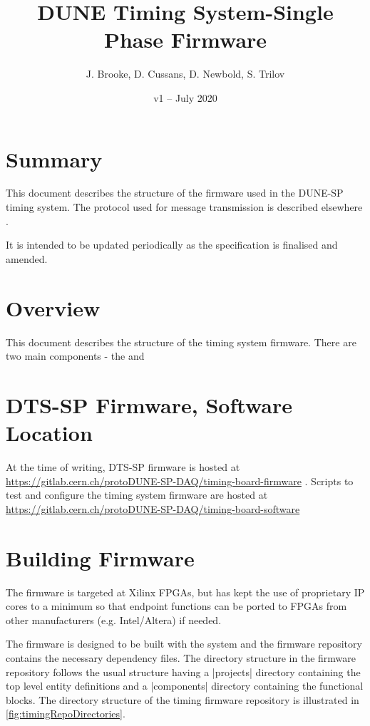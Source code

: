 \documentclass{dune}
\title{DUNE Timing System-Single Phase Firmware}
\author{J. Brooke, D. Cussans, D. Newbold, S. Trilov}
\date{v1 -- July 2020}
\begin{document}
\maketitle
\tableofcontents


\section{Summary}

This document describes the structure of the firmware used in the DUNE-SP timing system. The protocol used for message transmission is described elsewhere \cite{ref:dts-sp-timing-protocol}.

It is intended to be updated periodically as the specification is finalised and amended.

\section{Overview}

This document describes the structure of the timing system firmware. There are two main components - the  and 

\section{DTS-SP Firmware, Software Location}

At the time of writing, DTS-SP firmware is hosted at \url{https://gitlab.cern.ch/protoDUNE-SP-DAQ/timing-board-firmware} . Scripts to test and configure the timing system firmware are hosted at \url{https://gitlab.cern.ch/protoDUNE-SP-DAQ/timing-board-software}

\section{Building Firmware}

The firmware is targeted at Xilinx FPGAs, but has kept the use of proprietary IP cores to a minimum so that endpoint functions can be ported to FPGAs from other manufacturers (e.g. Intel/Altera) if needed.

The firmware is designed to be built with the  system and the firmware repository contains the necessary dependency files. The directory structure in the firmware repository follows the usual  structure having a |projects| directory containing the top level entity definitions and a |components| directory containing the functional blocks. The directory structure of the timing firmware repository is illustrated in \ref{fig:timingRepoDirectories}.
\end{document}
